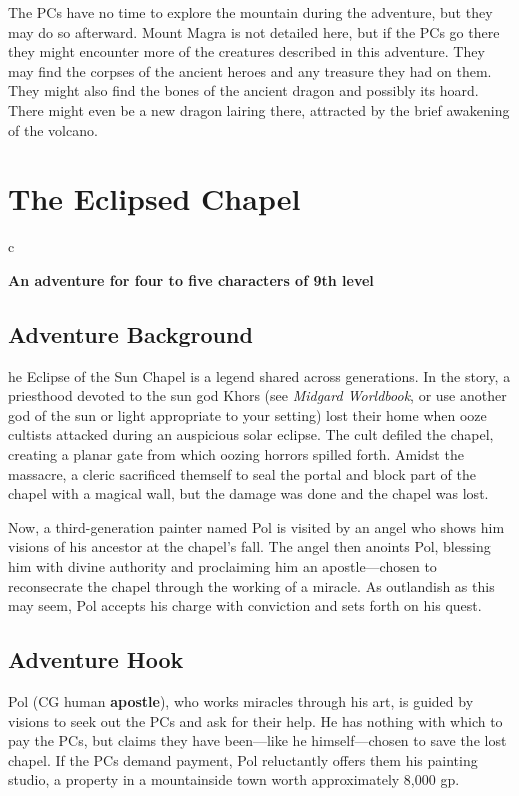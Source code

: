 \documentclass[10pt,a4paper,twoside,bg=print,twocolumn,openany,nodeprecatedcode]{dndbook}
\begin{document}
The PCs have no time to explore the mountain during the adventure, but they may do so afterward. Mount Magra is not detailed here, but if the PCs go there they might encounter more of the creatures described in this adventure. They may find the corpses of the ancient heroes and any treasure they had on them. They might also find the bones of the ancient dragon and possibly its hoard. There might even be a new dragon lairing there, attracted by the brief awakening of the volcano.

\chapter{The Eclipsed Chapel}

\begin{DndTable}{c}

\textbf{An adventure for four to five characters of 9th level}\\
\end{DndTable}

\section{Adventure Background}
he Eclipse of the Sun Chapel is a legend shared across generations. In the story, a priesthood devoted to the sun god Khors (see \textit{Midgard Worldbook}, or use another god of the sun or light appropriate to your setting) lost their home when ooze cultists attacked during an auspicious solar eclipse. The cult defiled the chapel, creating a planar gate from which oozing horrors spilled forth. Amidst the massacre, a cleric sacrificed themself to seal the portal and block part of the chapel with a magical wall, but the damage was done and the chapel was lost.


Now, a third-generation painter named Pol is visited by an angel who shows him visions of his ancestor at the chapel's fall. The angel then anoints Pol, blessing him with divine authority and proclaiming him an apostle—chosen to reconsecrate the chapel through the working of a miracle. As outlandish as this may seem, Pol accepts his charge with conviction and sets forth on his quest.

\section{Adventure Hook}
Pol (CG human \textbf{apostle}), who works miracles through his art, is guided by visions to seek out the PCs and ask for their help. He has nothing with which to pay the PCs, but claims they have been—like he himself—chosen to save the lost chapel. If the PCs demand payment, Pol reluctantly offers them his painting studio, a property in a mountainside town worth approximately 8,000 gp.
\end{document}
